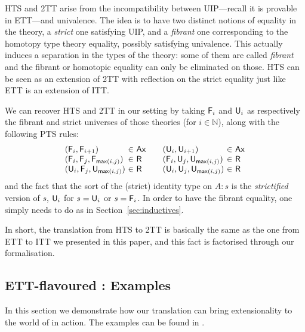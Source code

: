 HTS and 2TT arise from the incompatibility between UIP---recall it is provable
in ETT---and univalence. The idea is to have two distinct notions of equality
in the theory, a \emph{strict} one satisfying UIP, and a \emph{fibrant} one
corresponding to the homotopy type theory equality, possibly satisfying
univalence. This actually induces a separation in the types of the theory:
some of them are called \emph{fibrant} and the fibrant or homotopic equality
can only be eliminated on those.
HTS can be seen as an extension of 2TT with reflection on the strict equality
just like ETT is an extension of ITT.

We can recover HTS and 2TT in our setting by taking $\mathsf{F}_{i}$ and $\mathsf{U}_{i}$ as
respectively the fibrant and strict universes of those theories
(for $i \in \mathbb{N}$), along with the following PTS rules:
%
\[
\begin{array}{l@{~}c@{~}l@{\qquad}l@{~}c@{~}l}
  (\F{i}, \F{i+1}) &\in& \Ax &
  (\Un{i}, \Un{i+1}) &\in& \Ax \\
  (\F{i}, \F{j}, \F{\nmax{i}{j}}) &\in& \Rl &
  (\F{i}, \Un{j}, \Un{\nmax{i}{j}}) &\in& \Rl \\
  (\Un{i}, \F{j}, \Un{\nmax{i}{j}}) &\in& \Rl &
  (\Un{i}, \Un{j}, \Un{\nmax{i}{j}}) &\in& \Rl \\
\end{array}
\]
%
and the fact that the sort of the (strict) identity type on $A : s$ is
the \emph{strictified} version of $s$, \ie $\mathsf{U}_{i}$ for $s = \mathsf{U}_{i}$ or
$s = \mathsf{F}_{i}$.
In order to have the fibrant equality, one simply needs to do as in
Section~\ref{sec:inductives}.

In short, the translation from HTS to 2TT is basically the same as the one
from ETT to ITT we presented in this paper, and this fact is factorised through
our formalisation.

\subsection{ETT-flavoured \Coq: Examples}
\label{sec:examples}

In this section we demonstrate how our translation can bring extensionality to
the world of \Coq in action. The examples can be found in
.

